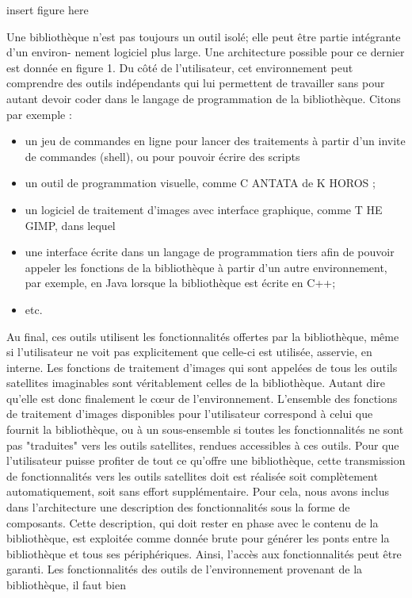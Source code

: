 insert figure here

Une bibliothèque n'est pas toujours un outil isolé; elle peut être partie intégrante d'un environ-
nement logiciel plus large. Une architecture possible pour ce dernier est donnée en figure 1.
Du côté de l'utilisateur, cet environnement peut comprendre des outils indépendants qui lui
permettent de travailler sans pour autant devoir coder dans le langage de programmation de la
bibliothèque. Citons par exemple :
\begin{itemize}
  \item un jeu de commandes en ligne pour lancer des traitements à partir d'un invite de commandes
        (shell), ou pour pouvoir écrire des scripts
  \item un outil de programmation visuelle, comme C ANTATA de K HOROS ;
  \item un logiciel de traitement d'images avec interface graphique, comme T HE GIMP, dans lequel
  \item une interface écrite dans un langage de programmation tiers afin de pouvoir appeler les
        fonctions de la bibliothèque à partir d'un autre environnement, par exemple, en Java lorsque la
        bibliothèque est écrite en C++;
  \item etc.
\end{itemize}
Au final, ces outils utilisent les fonctionnalités offertes par la bibliothèque, même si l'utilisateur
ne voit pas explicitement que celle-ci est utilisée, asservie, en interne. Les fonctions de traitement
d'images qui sont appelées de tous les outils satellites imaginables sont véritablement celles de la
bibliothèque. Autant dire qu'elle est donc finalement le cœur de l'environnement.
L'ensemble des fonctions de traitement d'images disponibles pour l'utilisateur correspond à
celui que fournit la bibliothèque, ou à un sous-ensemble si toutes les fonctionnalités ne sont pas
"traduites" vers les outils satellites, rendues accessibles à ces outils. Pour que l'utilisateur puisse
profiter de tout ce qu'offre une bibliothèque, cette transmission de fonctionnalités vers les outils
satellites doit est réalisée soit complètement automatiquement, soit sans effort supplémentaire.
Pour cela, nous avons inclus dans l'architecture une description des fonctionnalités sous la forme
de composants. Cette description, qui doit rester en phase avec le contenu de la bibliothèque, est
exploitée comme donnée brute pour générer les ponts entre la bibliothèque et tous ses périphériques.
Ainsi, l'accès aux fonctionnalités peut être garanti.
Les fonctionnalités des outils de l'environnement provenant de la bibliothèque, il faut bien
